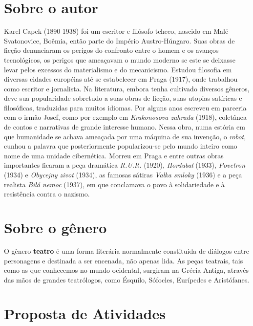 \documentclass[11pt]{extarticle}
\begin{document}

\section{Sobre o autor}

Karel Capek (1890-1938) foi um escritor e filósofo tcheco, nascido em Malé Svatonovice, Boêmia, então parte do Império Austro-Húngaro. Suas obras de ficção denunciaram os perigos do confronto entre o homem e os avanços tecnológicos, os perigos que ameaçavam o mundo moderno se este se deixasse levar pelos excessos do materialismo e do mecanicismo. Estudou filosofia em diversas cidades européias até se estabelecer em Praga (1917), onde trabalhou como escritor e jornalista. Na literatura, embora tenha cultivado diversos gêneros, deve sua popularidade sobretudo a suas obras de ficção, suas utopias satíricas e filosóficas, traduzidas para muitos idiomas. Por alguns anos escreveu em parceria com o irmão Josef, como por exemplo em \textit{Krakonosova zahrada} (1918), coletânea de contos e narrativas de grande interesse humano. Nessa obra, numa estória em que humanidade se achava ameaçada por uma máquina de sua invenção, o \textit{robot}, cunhou a palavra que posteriormente popularizou-se pelo mundo inteiro como nome de uma unidade cibernética. Morreu em Praga e entre outras obras importantes ficaram a peça dramática \textit{R.U.R.} (1920), \textit{Hordubal} (1933), \textit{Povetron} (1934) e \textit{Obycejny zivot} (1934), as famosas sátiras \textit{Valka smloky} (1936) e a peça realista \textit{Bilá nemoc} (1937), em que conclamava o povo à solidariedade e à resistência contra o nazismo.

\section{Sobre o gênero}

O gênero \textbf{teatro} é uma forma literária normalmente constituída de diálogos entre personagens e destinada a ser encenada, não apenas lida. As peças teatrais, tais como as que conhecemos no mundo ocidental, surgiram na Grécia Antiga, através das mãos de grandes teatrólogos, como Ésquilo, Sófocles, Eurípedes e Aristófanes.

\section{Proposta de Atividades}
\end{document}
